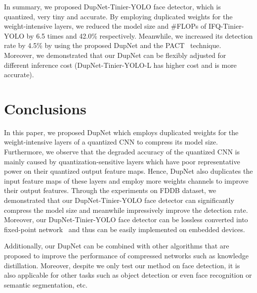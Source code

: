 \documentclass[10pt,twocolumn,letterpaper]{article}
\begin{document}
In summary, we proposed DupNet-Tinier-YOLO face detector, which is quantized, very tiny and accurate. By employing duplicated weights for the weight-intensive layers, we reduced the model size and \#FLOPs of IFQ-Tinier-YOLO by 6.5 times and 42.0\% respectively. Meanwhile, we increased its detection rate by 4.5\% by using the proposed DupNet and the PACT~\cite{PACT} technique.  Moreover, we demonstrated that our DupNet can be flexibly adjusted for different inference cost (\eg DupNet-Tinier-YOLO-L has higher cost and is more accurate).


\section{Conclusions}
In this paper, we proposed DupNet which employs duplicated weights for the weight-intensive layers of a quantized CNN to compress its model size. Furthermore, we observe that the degraded accuracy of the quantized CNN is mainly caused by quantization-sensitive layers which have poor representative power on their quantized output feature maps. Hence, DupNet also duplicates the input feature maps of these layers and employ more weights channels to improve their output features. Through the experiments on FDDB dataset, we demonstrated that our DupNet-Tinier-YOLO face detector can significantly compress the model size and meanwhile impressively improve the detection rate. Moreover, our DupNet-Tinier-YOLO face detector can be lossless converted into fixed-point network~\cite{IFQNet} and thus can be easily implemented on embedded devices.

Additionally, our DupNet can be combined with other algorithms that are proposed to improve the performance of compressed networks such as knowledge distillation. Moreover, despite we only test our method on face detection, it is also applicable for other tasks such as object detection or even face recognition or semantic segmentation, etc.

{\small


}
\end{document}
